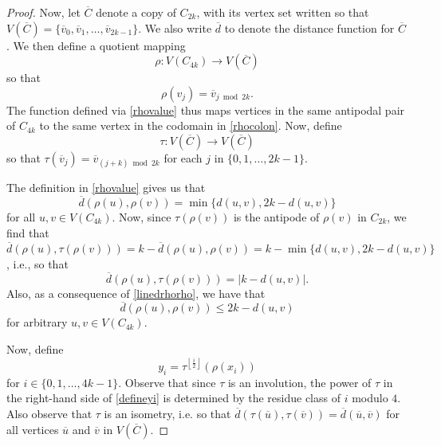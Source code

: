 \documentclass[12pt]{article}
\begin{document}
\begin{proof}
 Now, let $\overline{C}$ denote a copy of $C_{2k}$, 
 with its vertex set written so that 
 $V(\overline{C}) = \{ \overline{v}_{0}, \overline{v}_{1}, \ldots, \overline{v}_{2k-1} \}$. 
 We also write $\overline{d}$ to denote the distance function for $\overline{C}$. 
 We then define a quotient mapping 
\begin{equation}\label{rhocolon} 
 \rho\colon V(C_{4k}) \to V(\overline{C})
\end{equation}
 so that 
\begin{equation}\label{rhovalue}
 \rho(v_{j}) = \overline{v}_{j \bmod {2k}}. 
\end{equation} 
 The function defined via \eqref{rhovalue} thus maps vertices in the same antipodal pair of $C_{4k}$
 to the same vertex in the codomain in \eqref{rhocolon}. 
 Now, define
\begin{equation}\label{taucolon}
 \tau\colon V(\overline{C}) \to V(\overline{C})
\end{equation}
 so that 
 $ 
 \tau(\overline{v}_{j}) = \overline{v}_{(j+k) \bmod {2k}} $ 
 for each $j$ in $ \{ 0, 1, \ldots, 2k-1 \}$. 

 The definition in \eqref{rhovalue} gives us that 
\begin{equation}\label{linedrhorho}
 \overline{d}(\rho(u), \rho(v)) = \min\{ d(u, v), 2 k - d(u, v) \} 
\end{equation}
 for all $u, v \in V(C_{4k})$. 
 Now, since $\tau(\rho(v))$ is the antipode of $\rho(v)$ in $C_{2k}$, we find that 
$ \overline{d}(\rho(u), \tau(\rho(v)))
 = k - \overline{d}(\rho(u), \rho(v)) 
 = k - \min\{ d(u, v), 2 k - d(u, v) \}$, i.e., so that 
\begin{equation}\label{abskduv}
 \overline{d}(\rho(u), \tau(\rho(v))) = \left| k - d(u, v) \right|. 
\end{equation}
 Also, as a consequence of \eqref{linedrhorho}, we have that 
\begin{equation}\label{2kminusduv} 
 \overline{d}(\rho(u), \rho(v)) \leq 2 k - d(u, v) 
\end{equation}
 for arbitrary $u, v \in V(C_{4k})$. 

 Now, define
\begin{equation}\label{defineyi}
 y_{i} = \tau^{\left\lfloor \frac{i}{2} \right\rfloor}\left( \rho(x_{i}) \right) 
\end{equation}
 for $i \in \{ 0, 1, \ldots, 4k-1 \}$. 
 Observe that since $\tau$ is an involution, 
 the power of $\tau$ in the right-hand side of \eqref{defineyi} is determined by the residue class of $i$ modulo $4$.
 Also observe that $\tau$ is an isometry, i.e. 
 so that 
 $ \overline{d}\left( \tau(\overline{u}), \tau(\overline{v}) \right) 
 = \overline{d}\left( \overline{u}, \overline{v} \right) $ 
 for all vertices $\overline{u}$ and $\overline{v}$ in $V(\overline{C})$. 
 

\end{proof}
\end{document}
